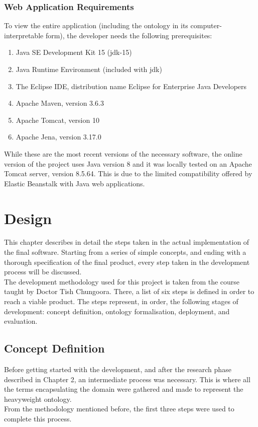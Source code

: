 \documentclass[12pt]{report}
\begin{document}
	\subsection{Web Application Requirements}
	To view the entire application (including the ontology in its computer-interpretable form), the developer needs the following prerequisites:
	\begin{enumerate}
	    \item Java SE Development Kit 15 (jdk-15)
	    \item Java Runtime Environment (included with jdk)
	    \item The Eclipse IDE, distribution name Eclipse for Enterprise Java Developers
	    \item Apache Maven, version 3.6.3
	    \item Apache Tomcat, version 10
	    \item Apache Jena, version 3.17.0
	\end{enumerate}
	While these are the most recent versions of the necessary software, the online version of the project uses Java version 8 and it was locally tested on an Apache Tomcat server, version 8.5.64. This is due to the limited compatibility offered by Elastic Beanstalk with Java web applications.
	
	\chapter{Design}
	This chapter describes in detail the steps taken in the actual implementation of the final software. Starting from a series of simple concepts, and ending with a thorough specification of the final product, every step taken in the development process will be discussed.\\
	The development methodology used for this project is taken from the course taught by Doctor Tish Chungoora. There, a list of six steps is defined in order to reach a viable product. The steps represent, in order, the following stages of development: concept definition, ontology formalisation, deployment, and evaluation.
	\section{Concept Definition}
	Before getting started with the development, and after the research phase described in Chapter 2, an intermediate process was necessary. This is where all the terms encapsulating the domain were gathered and made to represent the heavyweight ontology.\\
	From the methodology mentioned before, the first three steps were used to complete this process.
	
\end{document}
